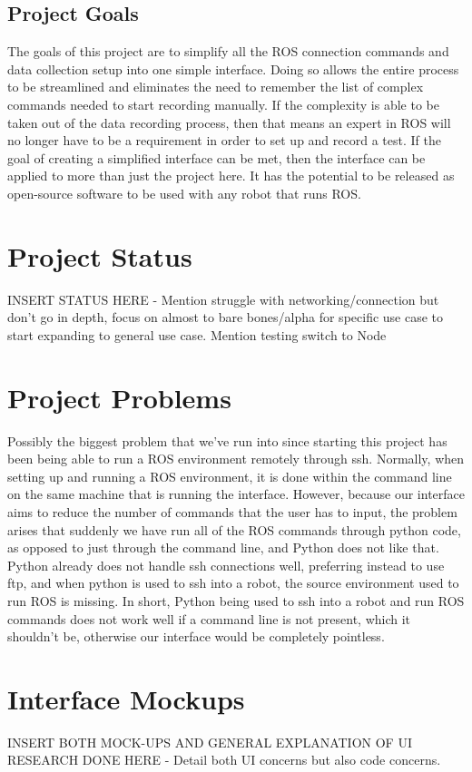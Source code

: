 \documentclass[onecolumn, draftclsnofoot,10pt, compsoc]{IEEEtran}
\begin{document}
\subsection{Project Goals}
The goals of this project are to simplify all the ROS connection commands and data collection setup into one simple interface. Doing so allows the entire process to be streamlined and eliminates the need to remember the list of complex commands needed to start recording manually. If the complexity is able to be taken out of the data recording process, then that means an expert in ROS will no longer have to be a requirement in order to set up and record a test. If the goal of creating a simplified interface can be met, then the interface can be applied to more than just the project here. It has the potential to be released as open-source software to be used with any robot that runs ROS.
\section{Project Status}
INSERT STATUS HERE - Mention struggle with networking/connection but don't go in depth, focus on almost to bare bones/alpha for specific use case to start expanding to general use case. Mention testing switch to Node

\section{Project Problems}
Possibly the biggest problem that we've run into since starting this project has been being able to run a ROS environment remotely through ssh. Normally, when setting up and running a ROS environment, it is done within the command line on the same machine that is running the interface. However, because our interface aims to reduce the number of commands that the user has to input, the problem arises that suddenly we have run all of the ROS commands through python code, as opposed to just through the command line, and Python does not like that. Python already does not handle ssh connections well, preferring instead to use ftp, and when python is used to ssh into a robot, the source environment used to run ROS is missing. In short, Python being used to ssh into a robot and run ROS commands does not work well if a command line is not present, which it shouldn't be, otherwise our interface would be completely pointless.

\section{Interface Mockups}
INSERT BOTH MOCK-UPS AND GENERAL EXPLANATION OF UI RESEARCH DONE HERE - Detail both UI concerns but also code concerns. 


\end{document}
